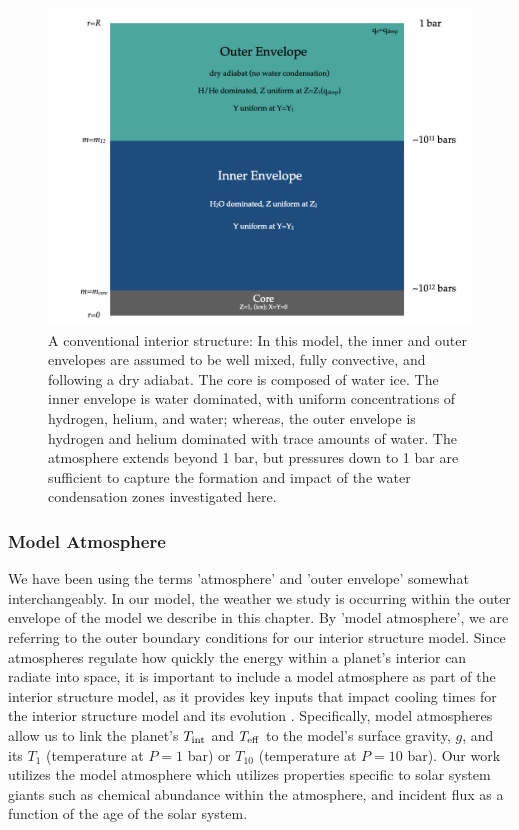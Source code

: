 \documentclass[11pt]{ucscthesisbs}
\begin{document}
\begin{figure}[ht!]
 \centerline{
  \includegraphics[width=6.0in]{figures/structure_schematic/structure_schematic.001.jpeg}
 }
\caption[A Standard Interior Structure Model]
{A conventional interior structure: In this model, the inner and outer envelopes are assumed to be well mixed, fully convective, and following a dry adiabat. The core is composed of water ice. The inner envelope is water dominated, with uniform concentrations of hydrogen, helium, and water; whereas, the outer envelope is hydrogen and helium dominated with trace amounts of water. The atmosphere extends beyond 1 bar, but pressures down to 1 bar are sufficient to capture the formation and impact of the water condensation zones investigated here.}
\label{fig:standard_dry_interior}
\end{figure}

\subsubsection{Model Atmosphere}
We have been using the terms 'atmosphere' and 'outer envelope' somewhat interchangeably. In our model, the weather we study is occurring within the outer envelope of the model we describe in this chapter. By 'model atmosphere', we are referring to the outer boundary conditions for our interior structure model. Since atmospheres regulate how quickly the energy within a planet's interior can radiate into space, it is important to include a model atmosphere as part of the interior structure model, as it provides key inputs that impact cooling times for the interior structure model and its evolution \citep{1975ApJ...199..265G,fortney_2011}. Specifically, model atmospheres allow us to link the planet's $T_{\rm int}$ and $T_{\rm eff}$ to the model's surface gravity, $g$, and its $T_{1}$ (temperature at $P = 1$ bar) or $T_{10}$ (temperature at $P = 10$ bar). Our work utilizes the \citep{fortney_2011} model atmosphere which utilizes properties specific to solar system giants such as chemical abundance within the atmosphere, and incident flux as a function of the age of the solar system. 
\end{document}
